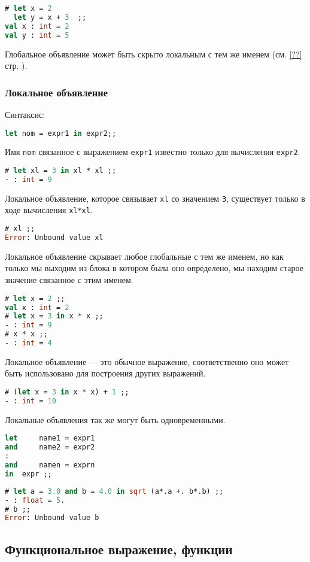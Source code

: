 \begin{lstlisting}[language=OCaml]
# let x = 2
  let y = x + 3  ;;
val x : int = 2
val y : int = 5
\end{lstlisting}

Глобальное объявление может быть скрыто локальным с тем же именем (см. \ref{??}
стр. \pageref{??}).

\subsubsection{Локальное объявление}

Синтаксис:

\begin{lstlisting}[language=OCaml]
let nom = expr1 in expr2;;
\end{lstlisting}

Имя \texttt{nom} связанное с выражением \texttt{expr1} известно только для
вычисления \texttt{expr2}.

\begin{lstlisting}[language=OCaml]
# let xl = 3 in xl * xl ;;
- : int = 9
\end{lstlisting}

Локальное объявление, которое связывает \texttt{xl} со значением \texttt{3},
существует только в ходе вычисления \texttt{xl*xl}.

\begin{lstlisting}[language=OCaml]
# xl ;;
Error: Unbound value xl
\end{lstlisting}

Локальное объявление скрывает любое глобальные с тем же именем, но как только мы
выходим из блока в котором была оно определено, мы находим старое значение
связанное с этим именем.

\begin{lstlisting}[language=OCaml]
# let x = 2 ;;
val x : int = 2
# let x = 3 in x * x ;;
- : int = 9
# x * x ;;
- : int = 4
\end{lstlisting}

Локальное объявление --- это обычное выражение, соответственно оно может быть
использовано для построения других выражений.

\begin{lstlisting}[language=OCaml]
# (let x = 3 in x * x) + 1 ;;
- : int = 10
\end{lstlisting}

Локальные объявления так же могут быть одновременными.

\begin{lstlisting}[language=OCaml]
let 	name1 = expr1
and 	name2 = expr2
:
and 	namen = exprn
in 	expr ;;
\end{lstlisting}

\begin{lstlisting}[language=OCaml]
# let a = 3.0 and b = 4.0 in sqrt (a*.a +. b*.b) ;;
- : float = 5.
# b ;;
Error: Unbound value b
\end{lstlisting}

\subsection{Функциональное выражение, функции}